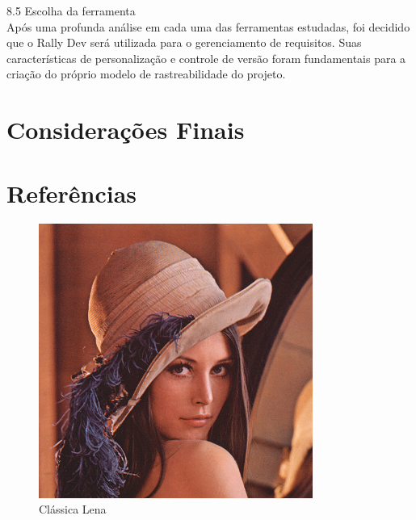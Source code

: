 {{{\large{8.5 Escolha da ferramenta}}\\

\tab Após uma profunda análise em cada uma das ferramentas estudadas, foi decidido que o Rally Dev será utilizada para o gerenciamento de requisitos. Suas características de personalização e controle de versão foram fundamentais para a criação do próprio modelo de rastreabilidade do projeto.  \\


\section{Considerações Finais}
\label{sec:nova_sess_o}

\section{Referências}
\label{sec:nova_sess_o}




\onecolumn
\begin{usecase}



\end{usecase}
\onecolumn

\onecolumn
\begin{figure}[h]
  \begin{center}
    \includegraphics[width=0.8\textwidth]{conteudo/lena}
    \caption{Clássica Lena}
  \end{center}
\end{figure}
\onecolumn

}}
